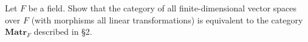Let $F$ be a field. Show that the category of all finite-dimensional vector spaces over $F$ (with morphisms all linear transformations) is equivalent to the category $\mathbf{Matr}_F$ described in \S 2.